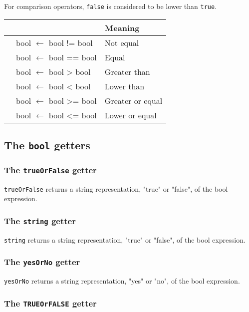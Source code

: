 \documentclass[10pt,openright,twosides]{report}
\newcommand{\scst}[1]{{\footnotesize\ttfamily\colorbox{light-blue}{"#1"}}}
\newcommand{\gtlinline}[1]{\colorbox{light-blue}{\lstinline[language=gtl]{#1}}}
\begin{document}
For comparison operators, \gtlinline{false} is considered to be lower than \gtlinline{true}.

\begin{longtable}{>{\ttfamily}l|>{\ttfamily}l|l}
{\bf Operator}&{\bf Expression type}&{\bf Meaning}\\
\hline\endhead
 {!=}&
  {bool $\leftarrow$ bool != bool}&
  {Not equal}\\
 {==}&
  {bool $\leftarrow$ bool == bool}&
  {Equal}\\
 {>}&
  {bool $\leftarrow$ bool > bool}&
  {Greater than}\\
 {<}&
  {bool $\leftarrow$ bool < bool}&
  {Lower than}\\
 {>=}&
  {bool $\leftarrow$ bool >= bool}&
  {Greater or equal}\\
 {<=}&
  {bool $\leftarrow$ bool <= bool}&
  {Lower or equal}\\
\end{longtable}

\subsection{The \texttt{bool} getters}

\subsubsection{The \texttt{trueOrFalse} getter}
\label{sec:trueOrFalseGetter}

\gtlinline{trueOrFalse} returns a string representation, \scst{true} or \scst{false}, of the bool expression.

\subsubsection{The \texttt{string} getter}

\gtlinline{string} returns a string representation, \scst{true} or \scst{false}, of the bool expression.

\subsubsection{The \texttt{yesOrNo} getter}

\gtlinline{yesOrNo} returns a string representation, \scst{yes} or \scst{no}, of the bool expression.

\subsubsection{The \texttt{TRUEOrFALSE} getter}
\label{sec:TRUEOrFALSEGetter}
\end{document}
